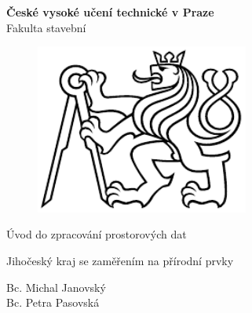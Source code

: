 \documentclass[a4paper, 12pt]{article}
\begin{document}
\begin{titlepage}
\begin{center}
\noindent
\Large \textbf{České vysoké učení technické v Praze }\\ Fakulta stavební
\vspace{5cm}

\huge

\begin{figure}[h!]
	\centering
	\includegraphics[width=7cm]{logo.png}
\end{figure}

\vspace{0.5cm}

Úvod do zpracování prostorových dat \\

\vspace{3cm}

\Huge  
Jihočeský kraj se zaměřením na přírodní prvky\\

\vspace{2cm}

\Large
Bc. Michal Janovský \\
Bc. Petra Pasovská \\

\end{center}

\end{titlepage}




\pagestyle{plain}     %
\setcounter{page}{1}  %

\tableofcontents
\newpage
\end{document}
